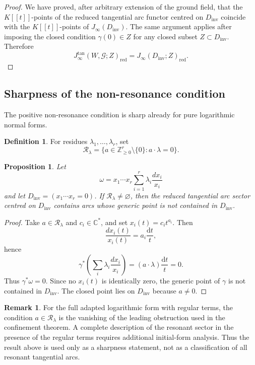 \documentclass[11pt]{amsart}
\numberwithin{equation}{section}
\theoremstyle{plain}
\newtheorem{Proposition}[Theorem]{Proposition}
\theoremstyle{definition}
\newtheorem{Definition}[Theorem]{Definition}
\newtheorem{Remark}[Theorem]{Remark}
\newcommand{\red}{\mathrm{red}}
\newcommand{\dd}{\mathrm d}
\newcommand{\Rlambda}{\mathcal R_\lambda}
\newcommand{\Dinv}{D_{\mathrm{inv}}}
\newcommand{\bC}{\mathbb C}
\newcommand{\bZ}{\mathbb Z}
\newcommand{\cG}{\mathcal G}
\begin{document}
\begin{proof}
We have proved, after arbitrary extension of the ground field, that the
\(K[[t]]\)-points of the reduced tangential arc functor centred on
\(\Dinv\) coincide with the \(K[[t]]\)-points of \(J_\infty(\Dinv)\).  The
same argument applies after imposing the closed condition \(\gamma(0)\in Z\)
for any closed subset \(Z\subset\Dinv\).  Therefore
\[
J_\infty^{\tan}(W,\cG;Z)_{\red}
=
J_\infty(\Dinv;Z)_{\red}.
\]
 
\end{proof}

\subsection{Sharpness of the non-resonance condition}

The positive non-resonance condition is sharp already for pure logarithmic
normal forms.

\begin{Definition} 
For residues $\lambda_1,\ldots,\lambda_r$, set
\[
\Rlambda=
\{a\in\bZ_{\geq 0}^r\setminus\{0\}:a\cdot\lambda=0\}.
\]
\end{Definition}

\begin{Proposition} 
\label{prop:resonant-arcs-pure-log}
Let
\[
\omega=x_1\cdots x_r\sum_{i=1}^r
\lambda_i\frac{dx_i}{x_i}
\]
and let $\Dinv=(x_1\cdots x_r=0)$.  If $\Rlambda\neq\varnothing$, then
the reduced tangential arc sector centred on $\Dinv$ contains arcs whose
generic point is not contained in $\Dinv$.
\end{Proposition}

\begin{proof}
Take $a\in\Rlambda$ and $c_i\in\bC^*$, and set $x_i(t)=c_it^{a_i}$.
Then
\[
\frac{dx_i(t)}{x_i(t)}=a_i\frac{\dd t}{t},
\]
hence
\[
\gamma^*
\left(
\sum_i\lambda_i\frac{dx_i}{x_i}
\right)
=
(a\cdot\lambda)\frac{\dd t}{t}=0.
\]
Thus $\gamma^*\omega=0$.  Since no $x_i(t)$ is identically zero, the
generic point of $\gamma$ is not contained in $\Dinv$.  The closed point
lies on $\Dinv$ because $a\neq0$.
\end{proof}

\begin{Remark}
For the full adapted logarithmic form with regular terms, the condition
$a\in\Rlambda$ is the vanishing of the leading obstruction used in the
confinement theorem.  A complete description of the resonant sector in the
presence of the regular terms requires additional initial-form analysis.
Thus the result above is used only as a sharpness statement, not as a
classification of all resonant tangential arcs.
\end{Remark}
\end{document}
